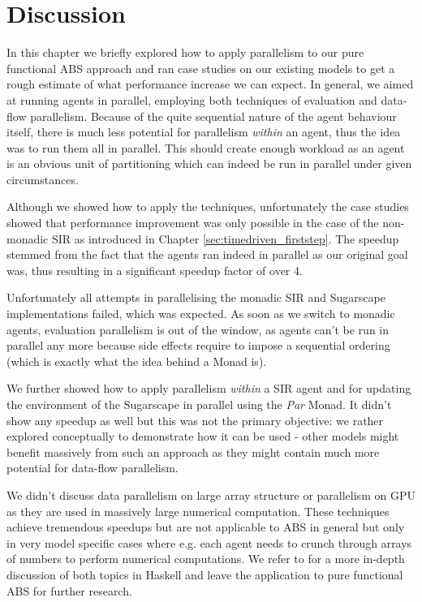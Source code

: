 \section{Discussion}
In this chapter we briefly explored how to apply parallelism to our pure functional ABS approach and ran case studies on our existing models to get a rough estimate of what performance increase we can expect. In general, we aimed at running agents in parallel, employing both techniques of evaluation and data-flow parallelism. Because of the quite sequential nature of the agent behaviour itself, there is much less potential for parallelism \textit{within} an agent, thus the idea was to run them all in parallel. This should create enough workload as an agent is an obvious unit of partitioning which can indeed be run in parallel under given circumstances.

Although we showed how to apply the techniques, unfortunately the case studies showed that performance improvement was only possible in the case of the non-monadic SIR as introduced in Chapter \ref{sec:timedriven_firststep}. The speedup stemmed from the fact that the agents ran indeed in parallel as our original goal was, thus resulting in a significant speedup factor of over 4. 

Unfortunately all attempts in parallelising the monadic SIR and Sugarscape implementations failed, which was expected. As soon as we switch to monadic agents, evaluation parallelism is out of the window, as agents can't be run in parallel any more because side effects require to impose a sequential ordering (which is exactly what the idea behind a Monad is).

We further showed how to apply parallelism \textit{within} a SIR agent and for updating the environment of the Sugarscape in parallel using the \textit{Par} Monad. It didn't show any speedup as well but this was not the primary objective: we rather explored conceptually to demonstrate how it can be used - other models might benefit massively from such an approach as they might contain much more potential for data-flow parallelism.

We didn't discuss data parallelism on large array structure or parallelism on GPU as they are used in massively large numerical computation. These techniques achieve tremendous speedups but are not applicable to ABS in general but only in very model specific cases where e.g. each agent needs to crunch through arrays of numbers to perform numerical computations. We refer to \cite{marlow_parallel_2013} for a more in-depth discussion of both topics in Haskell and leave the application to pure functional ABS for further research.

